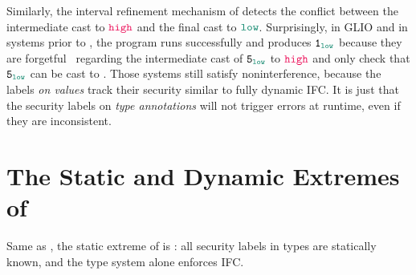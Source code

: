Similarly, the interval refinement mechanism of \GSLRef detects the conflict
between the intermediate cast to $\high$ and the final cast to $\low$.
Surprisingly, in GLIO and in systems prior to \GSLRef \parencite{Disney:2011fv,
  Fennell:2013ab}, the program runs successfully and produces $\key{1}_{\low}$
because they are forgetful~\parencite{Greenberg:2014aa} regarding the
intermediate cast of $\key{5}_{\low}$ to $\high$ and only check that
$\key{5}_{\low}$ can be cast to \low. Those systems still satisfy
noninterference, because the labels \textit{on values} track their security
similar to fully dynamic IFC. It is just that the security labels on
\textit{type annotations} will not trigger errors at runtime, even if they are
inconsistent.

\section{The Static and Dynamic Extremes of \Surface}
\label{sec:embedding}

Same as \GSLRef, the static extreme of \Surface is \SSLRef: all security labels
in types are statically known, and the type system alone enforces IFC.
